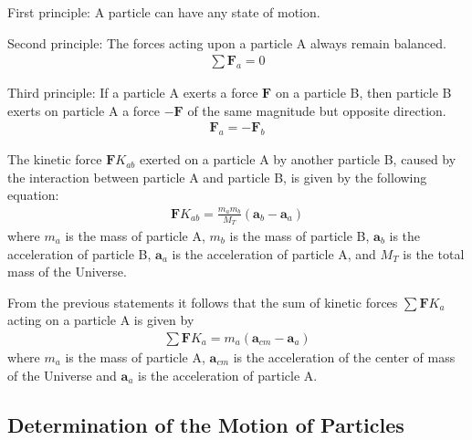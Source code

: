 \documentclass[12pt]{article}
\newcommand{\vA}{\mathbf{a}}
\newcommand{\vF}{\mathbf{F}}
\newcommand{\nK}{{\scriptstyle K}}
\newcommand{\mM}{m}
\newcommand{\mN}{M}
\newcommand{\ra}{_a}
\newcommand{\rb}{_b}
\newcommand{\rT}{_T}
\newcommand{\rab}{_{ab}}
\newcommand{\rcm}{_{cm}}
\begin{document}
\par First principle: A particle can have any state of motion.
\par Second principle: The forces acting upon a particle A always remain balanced.
\begin{eqnarray*}
\sum \vF\ra = 0
\end{eqnarray*}
\par Third principle: If a particle A exerts a force $\vF$ on a particle B, then particle B exerts on particle A a force $-\vF$ of the same magnitude but opposite direction.
\begin{eqnarray*}
\vF\ra = -\vF\rb
\end{eqnarray*}
\par The kinetic force $\vF\nK\rab$ exerted on a particle A by another particle B, caused by the interaction between particle A and particle B, is given by the following equation:
\begin{eqnarray*}
\vF\nK\rab = \frac{\mM\ra\mM\rb}{\mN\rT}(\vA\rb - \vA\ra)
\end{eqnarray*}
\noindent where $\mM\ra$ is the mass of particle A, $\mM\rb$ is the mass of particle B, $\vA\rb$ is the acceleration of particle B, $\vA\ra$ is the acceleration of particle A, and $\mN\rT$ is the total mass of the Universe.
\par From the previous statements it follows that the sum of kinetic forces $\sum \vF\nK\ra$ acting on a particle A is given by
\begin{eqnarray*}
\sum \vF\nK\ra = \mM\ra(\vA\rcm - \vA\ra)
\end{eqnarray*}
\noindent where $\mM\ra$ is the mass of particle A, $\vA\rcm$ is the acceleration of the center of mass of the Universe and $\vA\ra$ is the acceleration of particle A.

\newpage

{\centering\subsection{Determination of the Motion of Particles}}
\end{document}
